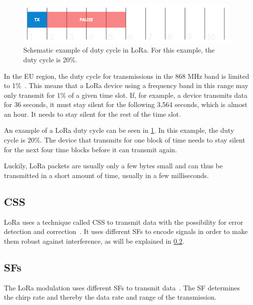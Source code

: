 \begin{figure}[htbp]
    \centering
    \includegraphics[width=.8\textwidth]{pictures/lora/duty-cycle-single-channel-off-air.png}
    \caption{
        Schematic example of duty cycle in \ac{LoRa}.
        For this example, the duty cycle is 20\%.~\protect\cite{the_things_industries_bv_duty_nodate}
    }\label{pic:lora-duty-cycle}
\end{figure}

In the \ac{EU} region, the duty cycle for transmissions in the 868 MHz band is limited to 1\%~\cite{etsi_etsi_2012}.
This means that a \ac{LoRa} device using a frequency band in this range may only transmit for 1\% of a given time slot.
If, for example, a device transmits data for 36 seconds, it must stay silent for the following 3,564 seconds, which is almost an hour.
It needs to stay silent for the rest of the time slot.

An example of a \ac{LoRa} duty cycle can be seen in \cref{pic:lora-duty-cycle}.
In this example, the duty cycle is 20\%.
The device that transmits for one block of time needs to stay silent for the next four time blocks before it can transmit again.

Luckily, LoRa packets are usually only a few bytes small and can thus be transmitted in a short amount of time, usually in a few milliseconds.

\subsection{\acf{CSS}}\label{sec:chirp-spread-spectrum}

\ac{LoRa} uses a technique called \acl{CSS} to transmit data with the possibility for error detection and correction~\cite{reynders_chirp_2016}.
It uses different \aclp{SF} to encode signals in order to make them robust against interference, as will be explained in \cref{sec:spreading-factors}.

\subsection{\acfp{SF}}\label{sec:spreading-factors}

The \ac{LoRa} modulation uses different \acfp{SF} to transmit data~\cite{the_things_network_spreading_2023}.
The \acl{SF} determines the chirp rate and thereby the data rate and range of the transmission.

